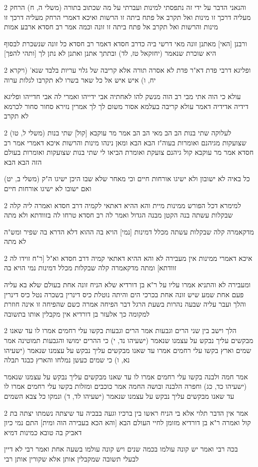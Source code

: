 \documentclass[12pt, openany]{book}
\newcommand{\sethebfont}{
\fontsize{10.5pt}{21.0pt} \selectfont
}
\newcommand{\twocol}[1]{
	{\sethebfont \begin{multicols}{2}
			#1
	\end{multicols}}	
}
\begin{document}
\twocol{והנאני הדבר על ידי זה נתפסתי למינות ועברתי על מה שכתוב בתורה (משלי ה, ח) הרחק מעליה דרכך זו מינות ואל תקרב אל פתח ביתה זו הרשות ואיכא דאמרי הרחק מעליה דרכך זו מינות והרשות ואל תקרב אל פתח ביתה זו זונה וכמה אמר רב חסדא ארבע אמות
\par ורבנן [האי] מאתנן זונה מאי דרשי ביה כדרב חסדא דאמר רב חסדא כל זונה שנשכרת לבסוף היא שוכרת שנאמר (יחזקאל טז, לד) ובתתך אתנן ואתנן לא נתן לך [ותהי להפך]}
\twocol{ופליגא דרבי פדת דא"ר פדת לא אסרה תורה אלא קריבה של גלוי עריות בלבד שנא' (ויקרא יח, ו) איש איש אל כל שאר בשרו לא תקרבו לגלות ערוה
\par עולא כי הוה אתי מבי רב הוה מנשק להו לאחתיה אבי ידייהו ואמרי לה אבי חדייהו ופליגא דידיה אדידיה דאמר עולא קריבה בעלמא אסור משום לך לך אמרין נזירא סחור סחור לכרמא לא תקרב}
\twocol{(משלי ל, טו) לעלוקה שתי בנות הב הב מאי הב הב אמר מר עוקבא [קול] שתי בנות שצועקות מגיהנם ואומרות בעוה"ז הבא הבא ומאן נינהו מינות והרשות איכא דאמרי אמר רב חסדא אמר מר עוקבא קול גיהנם צועקת ואומרת הביאו לי שתי בנות שצועקות ואומרות בעולם הזה הבא הבא
\par (משלי ב, יט) כל באיה לא ישובון ולא ישיגו אורחות חיים וכי מאחר שלא שבו היכן ישיגו ה"ק ואם ישובו לא ישיגו אורחות חיים}
\twocol{למימרא דכל הפורש ממינות מיית והא ההיא דאתאי לקמיה דרב חסדא ואמרה ליה קלה שבקלות עשתה בנה הקטן מבנה הגדול ואמר לה רב חסדא טרחו לה בזוודתא ולא מתה
\par מדקאמרה קלה שבקלות עשתה מכלל דמינות [נמי] הויא בה ההוא דלא הדרא בה שפיר ומש"ה לא מתה}
\twocol{איכא דאמרי ממינות אין מעבירה לא והא ההיא דאתאי קמיה דרב חסדא וא"ל [ר"ח זוידו לה זוודתא] ומתה מדקאמרה קלה שבקלות מכלל דמינות נמי הויא בה
\par ומעבירה לא והתניא אמרו עליו על ר"א בן דורדיא שלא הניח זונה אחת בעולם שלא בא עליה פעם אחת שמע שיש זונה אחת בכרכי הים והיתה נוטלת כיס דינרין בשכרה נטל כיס דינרין והלך ועבר עליה שבעה נהרות בשעת הרגל דבר הפיחה אמרה כשם שהפיחה זו אינה חוזרת למקומה כך אלעזר בן דורדיא אין מקבלין אותו בתשובה}
\twocol{הלך וישב בין שני הרים וגבעות אמר הרים וגבעות בקשו עלי רחמים אמרו לו עד שאנו מבקשים עליך נבקש על עצמנו שנאמר (ישעיהו נד, י) כי ההרים ימושו והגבעות תמוטינה אמר שמים וארץ בקשו עלי רחמים אמרו עד שאנו מבקשים עליך נבקש על עצמנו שנאמר (ישעיהו נא, ו) כי שמים כעשן נמלחו והארץ כבגד תבלה
\par אמר חמה ולבנה בקשו עלי רחמים אמרו לו עד שאנו מבקשים עליך נבקש על עצמנו שנאמר (ישעיהו כד, כג) וחפרה הלבנה ובושה החמה אמר כוכבים ומזלות בקשו עלי רחמים אמרו לו עד שאנו מבקשים עליך נבקש על עצמנו שנאמר (ישעיהו לד, ד) ונמקו כל צבא השמים}
\twocol{אמר אין הדבר תלוי אלא בי הניח ראשו בין ברכיו וגעה בבכיה עד שיצתה נשמתו יצתה בת קול ואמרה ר"א בן דורדיא מזומן לחיי העולם הבא [והא הכא בעבירה הוה ומית] התם נמי כיון דאביק בה טובא כמינות דמיא
\par בכה רבי ואמר יש קונה עולמו בכמה שנים ויש קונה עולמו בשעה אחת ואמר רבי לא דיין לבעלי תשובה שמקבלין אותן אלא שקורין אותן רבי}
\end{document}
